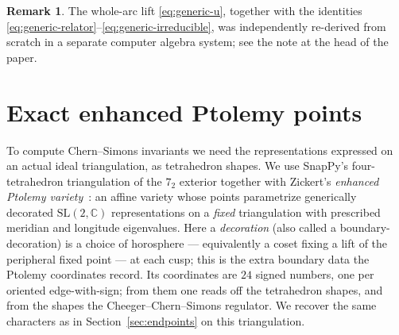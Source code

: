 \documentclass[11pt]{article}
\theoremstyle{definition}
\newtheorem{remark}{Remark}
\newcommand{\C}{\mathbb{C}}
\newcommand{\SL}{\mathrm{SL}}
\begin{document}
\begin{remark}
The whole-arc lift \eqref{eq:generic-u}, together with the identities
\eqref{eq:generic-relator}--\eqref{eq:generic-irreducible}, was independently
re-derived from scratch in a separate computer algebra system; see the note at
the head of the paper.
\end{remark}

\section{Exact enhanced Ptolemy points}\label{sec:ptolemy}

To compute Chern--Simons invariants we need the representations expressed on an
actual ideal triangulation, as tetrahedron shapes.  We use SnapPy's
four-tetrahedron triangulation of the $7_2$ exterior together with Zickert's
\emph{enhanced Ptolemy variety}~\cite{ZickertPtolemy}: an affine variety whose
points parametrize generically decorated $\SL(2,\C)$
representations on a \emph{fixed} triangulation with prescribed meridian and
longitude eigenvalues.  Here a \emph{decoration} (also called a
boundary-decoration) is a choice of horosphere --- equivalently a coset fixing a
lift of the peripheral fixed point --- at each cusp; this is the extra boundary
data the Ptolemy coordinates record.  Its coordinates are $24$ signed numbers, one per
oriented edge-with-sign; from them one reads off the tetrahedron shapes, and
from the shapes the Cheeger--Chern--Simons regulator.  We recover the same
characters as in Section~\ref{sec:endpoints} on this triangulation.
\end{document}
